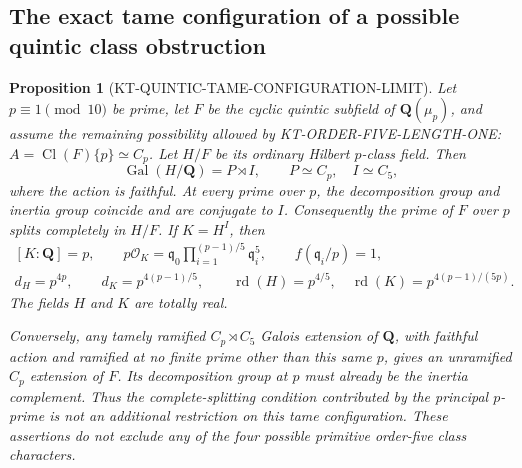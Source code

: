 \documentclass[11pt,a4paper]{article}
\newtheorem{proposition}[theorem]{Proposition}
\theoremstyle{definition}
\begin{document}


\subsection{The exact tame configuration of a possible quintic class obstruction}

\begin{proposition}[KT-QUINTIC-TAME-CONFIGURATION-LIMIT]
Let $p\equiv1\pmod {10}$ be prime, let $F$ be the cyclic quintic
subfield of $\mathbf Q(\mu_p)$, and assume the remaining possibility
allowed by KT-ORDER-FIVE-LENGTH-ONE:
$A=\operatorname{Cl}(F)\{p\}\simeq C_p$.
Let $H/F$ be its ordinary Hilbert $p$-class field.  Then
\[
 \operatorname{Gal}(H/\mathbf Q)=P\rtimes I,
 \qquad P\simeq C_p,\quad I\simeq C_5,                 \tag{QTC.1}
\]
where the action is faithful.  At every prime over $p$, the
decomposition group and inertia group coincide and are conjugate to
$I$.  Consequently the prime of $F$ over $p$ splits completely in
$H/F$.  If $K=H^I$, then
\[
 \begin{gathered}
 [K:\mathbf Q]=p,\qquad
 p\mathcal O_K=\mathfrak q_0
       \prod_{i=1}^{(p-1)/5}\mathfrak q_i^5,
 \qquad f(\mathfrak q_i/p)=1,\\
 d_H=p^{4p},\qquad d_K=p^{4(p-1)/5},\qquad
 \operatorname{rd}(H)=p^{4/5},\quad
 \operatorname{rd}(K)=p^{4(p-1)/(5p)}.                 \tag{QTC.2}
 \end{gathered}
\]
The fields $H$ and $K$ are totally real.

Conversely, any tamely ramified $C_p\rtimes C_5$ Galois extension
of $\mathbf Q$, with faithful action and ramified at no finite prime
other than this same $p$, gives an unramified $C_p$ extension of $F$.
Its decomposition group at $p$ must already be the inertia complement.
Thus the complete-splitting condition contributed by the principal
$p$-prime is not an additional restriction on this tame configuration.
These assertions do not exclude any of the four possible primitive
order-five class characters.
\end{proposition}
\end{document}
